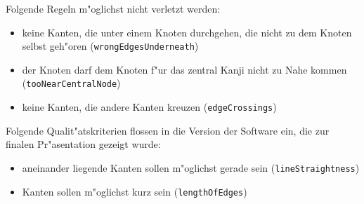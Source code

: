 Folgende Regeln m"oglichst nicht verletzt werden:

\begin{itemize}
\item
  keine Kanten, die unter einem Knoten durchgehen, die nicht zu dem
  Knoten selbst geh"oren (\texttt{wrongEdgesUnderneath})
\item
  der Knoten darf dem Knoten f"ur das zentral Kanji nicht zu Nahe kommen
  (\texttt{tooNearCentralNode})
\item
  keine Kanten, die andere Kanten kreuzen (\texttt{edgeCrossings})
\end{itemize}

Folgende Qualit"atskriterien flossen in die Version der Software ein, die
zur finalen Pr"asentation gezeigt wurde:

\begin{itemize}
\item
  aneinander liegende Kanten sollen m"oglichst gerade sein
  (\texttt{lineStraightness})
\item
  Kanten sollen m"oglichst kurz sein (\texttt{lengthOfEdges})
\end{itemize}
